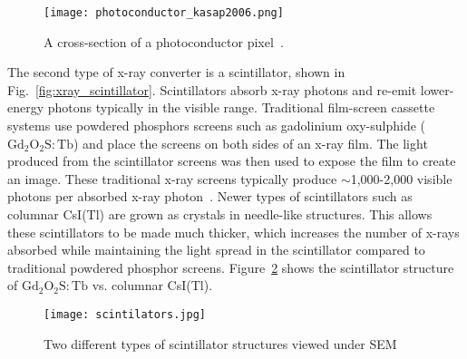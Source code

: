\begin{figure}[ht]
\centering
\texttt{[image: photoconductor\_kasap2006.png]}
\caption{A cross-section of a photoconductor pixel~\citep{kasap2006}.}
\label{fig:photoconductor_cross_section}
\end{figure}

The second type of x-ray converter is a scintillator, shown in Fig.~\ref{fig:xray_scintillator}.  Scintillators absorb x-ray photons and re-emit lower-energy photons typically in the visible range.  Traditional film-screen cassette systems use powdered phosphors screens such as gadolinium oxy-sulphide ($\mathrm{Gd_2O_2S \colon Tb}$) and place the screens on both sides of an x-ray film.  The light produced from the scintillator screens was then used to expose the film to create an image.  These traditional x-ray screens typically produce $\sim$1,000-2,000 visible photons per absorbed x-ray photon~\citep{trauernicht1988, trauernicht1990}. Newer types of scintillators such as columnar CsI(Tl) are grown as crystals in needle-like structures.  This allows these scintillators to be made much thicker, which increases the number of x-rays absorbed while maintaining the light spread in the scintillator compared to traditional powdered phosphor screens.  Figure~\ref{fig:scintillators} shows the scintillator structure of $\mathrm{Gd_2O_2S:Tb}$ vs. columnar CsI(Tl).

\begin{figure}[ht]
\texttt{[image: scintilators.jpg]}
\caption{Two different types of scintillator structures viewed under SEM~\citep{scintillatorImage}}
\label{fig:scintillators}
\end{figure}


